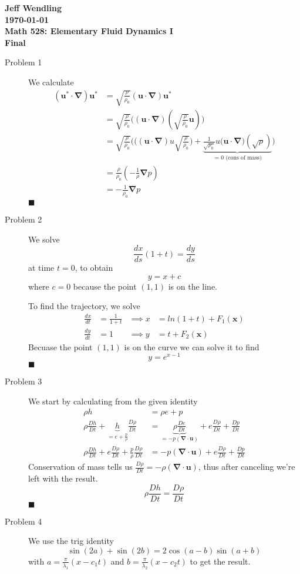 \documentclass[11pt]{article}
\newcommand{\eq}[1]{\begin{align*}#1\end{align*}}
\newcommand{\de}[2]{\frac{d #1}{d #2}}
\newcommand{\td}[2]{\frac{D #1}{D #2}}
\newcommand{\nab}[0]{\bm{\nabla}}
\begin{document}
\begin{center}
{\large\bf 
Jeff Wendling\\
\today\\
Math 528: Elementary Fluid Dynamics I\\
Final
}
\end{center}
\begin{description}
\item[Problem 1] We calculate
\eq{
  (\bm{u}^* \cdot \nab)\bm{u}^*
  &=
  \sqrt{\frac{\rho}{\rho_0}}
  (\bm{u} \cdot \nab)\bm{u}^*
  \\
%
%
  &=
  \sqrt{\frac{\rho}{\rho_0}}
  \big(
  (\bm{u} \cdot \nab)
  (\sqrt{\frac{\rho}{\rho_0}} \bm{u})
  \big)
  \\
%
%
  &=
  \sqrt{\frac{\rho}{\rho_0}}
  \bigg(
  \big(
    (\bm{u} \cdot \nab) u
    \sqrt{\frac{\rho}{\rho_0}}
  \big)
  +
  \underbrace{
  \frac{1}{\sqrt{\rho_0}}
  u
  \big(
    \bm{u} \cdot \nab
  \big)
  ( \sqrt{\rho} )
  }_{=0 \mbox{ (cons of mass)}}
  \bigg)
  \\
%
%
  &=
  \frac{\rho}{\rho_0}
  (-\frac{1}{\rho} \nab p)
  \\
  &=
  -\frac{1}{\rho_0} \nab p
}
\hfill $\blacksquare$
\item[Problem 2]
We solve
$$
  \de{x}{s}(1 + t) = \de{y}{s}
$$
at time $t = 0$, to obtain
$$
  y = x + c
$$
where $c = 0$ because the point $(1, 1)$ is on the line.

To find the trajectory, we solve
\eq{
  \de{x}{t} &= \frac{1}{1+t}
  &\implies
  x &= ln(1 + t) + F_1(\bm{x})
  \\
  \de{y}{t} &= 1
  &\implies
  y &= t + F_2(\bm{x})
}
Becuase the point $(1, 1)$ is on the curve we can solve it to find
$$
  y = e^{x-1}
$$
\hfill $\blacksquare$
\item[Problem 3]
We start by calculating from the given identity
\eq{
  \rho h
  &=
  \rho e + p
  \\
%
%
  \rho \td{h}{t}
  + 
  \underbrace{h}_{= e + \frac{p}{\rho}}
  \td{\rho}{t}
  &= 
  \underbrace{
    \rho \td{e}{t}
  }_{= - p(\nab \cdot \bm{u})}
  + e \td{\rho}{t}
  + \td{p}{t}
  \\
%
%
  \rho \td{h}{t}
  + e \td{\rho}{t}
  + \frac{p}{\rho} \td{\rho}{t}
  &=
  -p(\nab \cdot \bm{u})
  + e\td{\rho}{t}
  + \td{p}{t}
}
Conservation of mass tells us $\td{\rho}{t} = -\rho(\nab \cdot \bm{u})$, thus
after canceling we're left with the result.
$$
  \rho \td{h}{t} = \td{\rho}{t}
$$
\hfill $\blacksquare$
\item[Problem 4]
We use the trig identity
$$
  \sin(2a) + \sin(2b) = 2\cos(a-b)\sin(a+b)
$$
with
  $a = \frac{\pi}{\lambda_1}(x - c_1 t)$
and
  $b = \frac{\pi}{\lambda_2}(x - c_2 t)$
to get the result.


\end{description}
\end{document}
